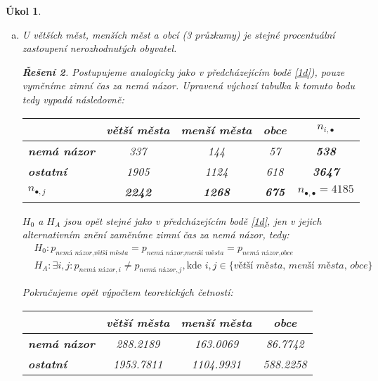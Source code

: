 \documentclass[11pt, a4paper]{article}
\theoremstyle{result}
\newtheorem*{result}{Řešení}
\newtheorem{task}{Úkol}
\begin{document}
\begin{task}
\begin{enumerate}[a)]
\begin{result}
        \end{result}
        
        \item U větších měst, menších měst a obcí (3 průzkumy) je stejné procentuální zastoupení nerozhodnutých obyvatel. \label{1e}

        \begin{result}
            Postupujeme analogicky jako v předcházejícím bodě \ref{1d}), pouze vyměníme \textit{zimní čas} za \textit{nemá názor}. Upravená výchozí tabulka k tomuto bodu tedy vypadá následovně:

            \begin{center}
                \begin{tabular}{ |l|c|c|c|c| }
                    \hline
                    & \textbf{větší města} & \textbf{menší města} & \textbf{obce} & \boldmath$n_{i, \bullet}$ \\
                    \hline
                    \textbf{nemá názor} & 337 & 144 & 57 & \textbf{538} \\
                    \hline
                    \textbf{ostatní} & 1905 & 1124 & 618 & \textbf{3647} \\
                    \hline
                    \boldmath$n_{\bullet, j}$ & \textbf{2242} & \textbf{1268} & \textbf{675} & \boldmath$n_{\bullet, \bullet} = 4185$ \\
                    \hline
                \end{tabular}
            \end{center}

            $H_0$ a $H_A$ jsou opět stejné jako v předcházejícím bodě \ref{1d}, jen v jejich alternativním znění zaměníme \textit{zimní čas} za \textit{nemá názor}, tedy:
            \begin{align*}
                &H_0: p_{\textit{nemá názor}, \textit{větší města}} = p_{\textit{nemá názor}, \textit{menší města}} = p_{\textit{nemá názor}, \textit{obce}} \\
                &H_A: \exists i, j: p_{\textit{nemá názor}, i} \neq p_{\textit{nemá názor}, j}, \text{kde } i,j \in \{\textit{větší města, menší města, obce}\}
            \end{align*}

            Pokračujeme opět výpočtem teoretických četností:

            \begin{center}
                \begin{tabular}{ |l|c|c|c| }
                    \hline
                    & \textbf{větší města} & \textbf{menší města} & \textbf{obce} \\
                    \hline
                    \textbf{nemá názor} & 288.2189 & 163.0069 & 86.7742 \\
                    \hline
                    \textbf{ostatní} & 1953.7811 & 1104.9931 & 588.2258 \\
                    \hline
                \end{tabular}
            \end{center}


\end{result}
\end{enumerate}
\end{task}
\end{document}
